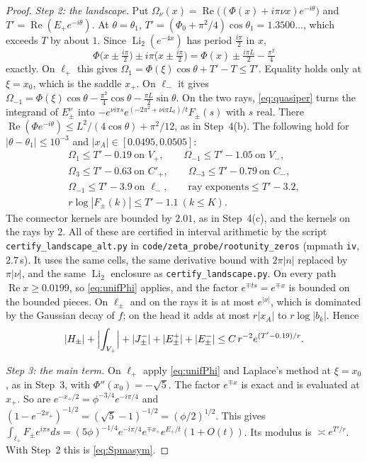 \documentclass[11pt]{article}
\theoremstyle{plain}
\theoremstyle{definition}
\theoremstyle{remark}
\theoremstyle{plain}\newtheorem*{maintheorem}{Main Theorem}
\begin{document}
\begin{proof}
\emph{Step 2: the landscape.} Put $\Omega_\nu(x)=\operatorname{Re}\bigl((\Phi(x)+i\pi\nu x)e^{-i\theta}\bigr)$
and $T'=\operatorname{Re}(E_+e^{-i\theta})$. At $\theta=\theta_1$, $T'=(\Phi_0+\pi^2/4)\cos\theta_1=1.3500\ldots$,
which exceeds $T$ by about $1$. Since $\operatorname{Li}_2(e^{-4x})$ has period $\frac{i\pi}2$ in $x$,
\[
   \Phi\bigl(x\pm\tfrac{i\pi}2\bigr)\pm i\pi\bigl(x\pm\tfrac{i\pi}2\bigr)=\Phi(x)\pm\tfrac{i\pi L}2-\tfrac{\pi^2}4
\]
exactly. On $\ell_+$ this gives $\Omega_1=\Phi(\xi)\cos\theta+T'-T\le T'$. Equality holds only at
$\xi=x_0$, which is the saddle $x_+$. On $\ell_-$ it gives
$\Omega_{-1}=\Phi(\xi)\cos\theta-\frac{\pi^2}4\cos\theta-\frac{\pi L}2\sin\theta$. On the two rays,
\eqref{eq:quasiper} turns the integrand of $E^\nu_\pm$ into
$-e^{\nu i\pi s}e^{(-2\pi^2+\nu i\pi L_t)/t}F_\pm(s)$ with $s$ real. There
$\operatorname{Re}(\Phi e^{-i\theta})\le L^2/(4\cos\theta)+\pi^2/12$, as in Step~4\textup{(b)}. The
following hold for $|\theta-\theta_1|\le10^{-3}$ and $|x_A|\in[0.0495,0.0505]$:
\[
 \begin{gathered}
   \Omega_1\le T'-0.19\ \text{on }V_+,\qquad \Omega_{-1}\le T'-1.05\ \text{on }V_-,\\
   \Omega_3\le T'-0.63\ \text{on }C'_+,\qquad \Omega_{-3}\le T'-0.79\ \text{on }C_-,\\
   \Omega_{-1}\le T'-3.9\ \text{on }\ell_-,\qquad
   \text{ray exponents}\le T'-3.2,\\
   r\log|F_\pm(k)|\le T'-1.1\ (k\le K).
 \end{gathered}
\]
The connector kernels are bounded by $2.01$, as in Step~4\textup{(c)}, and the kernels on the rays
by $2$. All of these are certified in interval arithmetic by the script
\texttt{certify\_landscape\_alt.py} in \texttt{code/zeta\_probe/rootunity\_zeros} (mpmath
\texttt{iv}, $2.7$\,s).
It uses the same cells, the same derivative bound with $2\pi|n|$ replaced by $\pi|\nu|$, and the
same $\operatorname{Li}_2$ enclosure as \texttt{certify\_landscape.py}. On every path
$\operatorname{Re}x\ge0.0199$, so \eqref{eq:unifPhi} applies, and the factor $e^{\mp ts}=e^{\mp x}$
is bounded on the bounded pieces. On $\ell_\pm$ and on the rays it is at most $e^{|x|}$, which is
dominated by the Gaussian decay of $f$; on the head it adds at most $r|x_A|$ to $r\log|b_k|$. Hence
\[
   |H_\pm|+\Bigl|\int_{V_+}\Bigr|+|J^-_\pm|+|E^+_\pm|+|E^-_\pm|\le C\,r^{-2}e^{(T'-0.19)/r}.
\]

\emph{Step 3: the main term.} On $\ell_+$ apply \eqref{eq:unifPhi} and Laplace's method at
$\xi=x_0$, as in Step~3, with $\Phi''(x_0)=-\sqrt5$. The factor $e^{\mp x}$ is exact and is
evaluated at $x_+$. So are $e^{-x_+/2}=\phi^{-3/4}e^{-i\pi/4}$ and
$(1-e^{-2x_+})^{-1/2}=(\sqrt5-1)^{-1/2}=(\phi/2)^{1/2}$. This gives
$\int_{\ell_+}F_\pm e^{i\pi s}ds=(5\phi)^{-1/4}e^{-i\pi/4}e^{\mp x_+}e^{E_+/t}(1+O(t))$. Its modulus
is $\asymp e^{T'/r}$. With Step~2 this is \eqref{eq:Spmasym}.


\end{proof}
\end{document}
